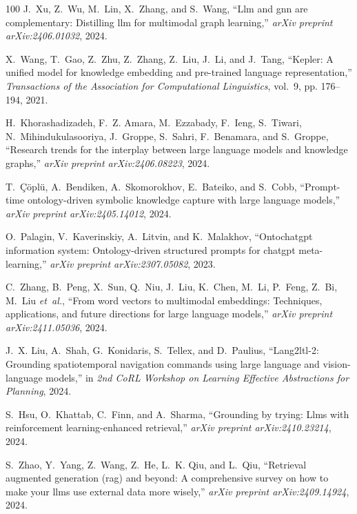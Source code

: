 \documentclass[10pt,journal,compsoc]{IEEEtran}
\begin{document}
\begin{thebibliography}{100}
	J.~Xu, Z.~Wu, M.~Lin, X.~Zhang, and S.~Wang, ``Llm and gnn are complementary:
	Distilling llm for multimodal graph learning,'' \emph{arXiv preprint
		arXiv:2406.01032}, 2024.
	
	X.~Wang, T.~Gao, Z.~Zhu, Z.~Zhang, Z.~Liu, J.~Li, and J.~Tang, ``Kepler: A
	unified model for knowledge embedding and pre-trained language
	representation,'' \emph{Transactions of the Association for Computational
		Linguistics}, vol.~9, pp. 176--194, 2021.
	
	H.~Khorashadizadeh, F.~Z. Amara, M.~Ezzabady, F.~Ieng, S.~Tiwari,
	N.~Mihindukulasooriya, J.~Groppe, S.~Sahri, F.~Benamara, and S.~Groppe,
	``Research trends for the interplay between large language models and
	knowledge graphs,'' \emph{arXiv preprint arXiv:2406.08223}, 2024.
	
	T.~{\c{C}}{\"o}pl{\"u}, A.~Bendiken, A.~Skomorokhov, E.~Bateiko, and S.~Cobb,
	``Prompt-time ontology-driven symbolic knowledge capture with large language
	models,'' \emph{arXiv preprint arXiv:2405.14012}, 2024.
	
	O.~Palagin, V.~Kaverinskiy, A.~Litvin, and K.~Malakhov, ``Ontochatgpt
	information system: Ontology-driven structured prompts for chatgpt
	meta-learning,'' \emph{arXiv preprint arXiv:2307.05082}, 2023.
	
	C.~Zhang, B.~Peng, X.~Sun, Q.~Niu, J.~Liu, K.~Chen, M.~Li, P.~Feng, Z.~Bi,
	M.~Liu \emph{et~al.}, ``From word vectors to multimodal embeddings:
	Techniques, applications, and future directions for large language models,''
	\emph{arXiv preprint arXiv:2411.05036}, 2024.
	
	J.~X. Liu, A.~Shah, G.~Konidaris, S.~Tellex, and D.~Paulius, ``Lang2ltl-2:
	Grounding spatiotemporal navigation commands using large language and
	vision-language models,'' in \emph{2nd CoRL Workshop on Learning Effective
		Abstractions for Planning}, 2024.
	
	S.~Hsu, O.~Khattab, C.~Finn, and A.~Sharma, ``Grounding by trying: Llms with
	reinforcement learning-enhanced retrieval,'' \emph{arXiv preprint
		arXiv:2410.23214}, 2024.
	
	S.~Zhao, Y.~Yang, Z.~Wang, Z.~He, L.~K. Qiu, and L.~Qiu, ``Retrieval augmented
	generation (rag) and beyond: A comprehensive survey on how to make your llms
	use external data more wisely,'' \emph{arXiv preprint arXiv:2409.14924},
	2024.
	

\end{thebibliography}
\end{document}
